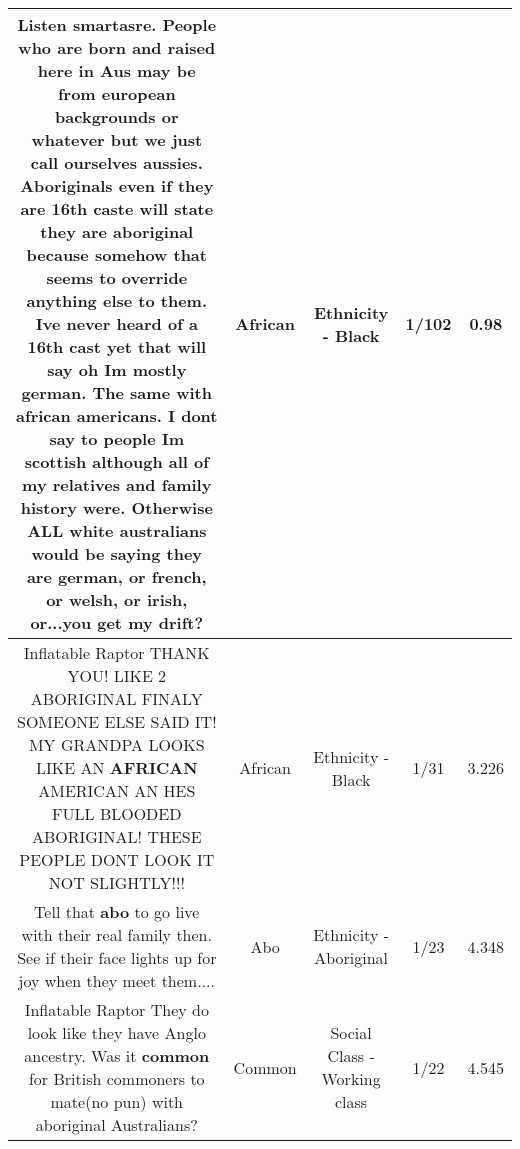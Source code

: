\documentclass[11pt]{article}
\newlength\mylength
\begin{document}
\begin{center}
\begin{longtable}{|C{.65\mylength}|C{.30\mylength}|C{.12\mylength}|C{.12\mylength}|C{.12\mylength}|}
  \small Listen smartasre. People who are born and raised here in Aus may be from european backgrounds or whatever but we just call ourselves aussies. Aboriginals even if they are 16th caste will state they are aboriginal because somehow that seems to override anything else to them. Ive never heard of a 16th cast yet that will say oh Im mostly german. The same with \textbf{african} americans. I dont say to people Im scottish although all of my relatives and family history were. Otherwise ALL white australians would be saying they are german, or french, or welsh, or irish, or...you get my drift?\normalsize   & African & Ethnicity - Black & 1/102 & 0.98 \\  \hline
  \small Inflatable Raptor THANK YOU! LIKE 2 ABORIGINAL FINALY SOMEONE ELSE SAID IT! MY GRANDPA LOOKS LIKE AN \textbf{AFRICAN} AMERICAN AN HES FULL BLOODED ABORIGINAL! THESE PEOPLE DONT LOOK IT NOT SLIGHTLY!!!\normalsize   & African & Ethnicity - Black & 1/31 & 3.226 \\  \hline
  \small Tell that \textbf{abo} to go live with their real family then. See if their face lights up for joy when they meet them....\normalsize   & Abo & Ethnicity - Aboriginal & 1/23 & 4.348 \\  \hline
  \small Inflatable Raptor They do look like they have Anglo ancestry. Was it \textbf{common} for British commoners to mate(no pun) with aboriginal Australians?\normalsize   & Common & Social Class - Working class & 1/22 & 4.545 \\  \hline

\end{longtable}
\end{center}
\end{document}
